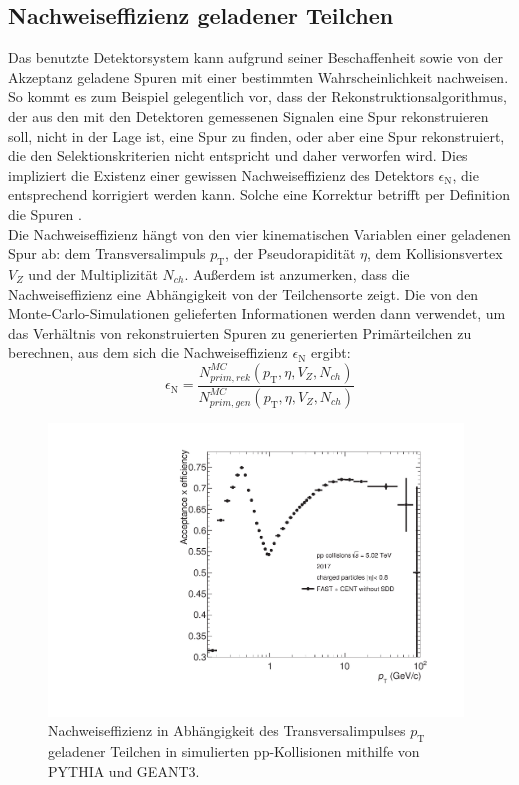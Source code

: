 \documentclass[12pt,a4paper]{report}
\begin{document}
\subsection{Nachweiseffizienz geladener Teilchen}
Das benutzte Detektorsystem kann aufgrund seiner Beschaffenheit sowie von der Akzeptanz geladene Spuren mit einer bestimmten Wahrscheinlichkeit nachweisen. So kommt es zum Beispiel gelegentlich vor, dass der Rekonstruktionsalgorithmus, der aus den mit den Detektoren gemessenen Signalen eine Spur rekonstruieren soll, nicht in der Lage ist, eine Spur zu finden, oder aber eine Spur rekonstruiert, die den Selektionskriterien nicht entspricht und daher verworfen wird. Dies impliziert die Existenz einer gewissen Nachweiseffizienz des Detektors $\epsilon_{\mathrm{N}}$, die entsprechend korrigiert werden kann. Solche eine Korrektur betrifft per Definition die Spuren \cite{Acharya:2018qsh}.\\
Die Nachweiseffizienz hängt von den vier kinematischen Variablen einer geladenen Spur ab: dem Transversalimpuls $p_{\mathrm{T}}$, der Pseudorapidität $\eta$, dem Kollisionsvertex $V_{Z}$ und der Multiplizität $N_{ch}$. Außerdem ist anzumerken, dass die Nachweiseffizienz eine Abhängigkeit von der Teilchensorte zeigt. Die von den Monte-Carlo-Simulationen gelieferten Informationen werden dann verwendet, um das Verhältnis von rekonstruierten Spuren zu generierten Primärteilchen zu berechnen, aus dem sich die Nachweiseffizienz $\epsilon_{\mathrm{N}}$ ergibt:
\begin{equation} \label{eq:TrackingEff}
  \epsilon_{\mathrm{N}}=\dfrac{N^{MC}_{prim,rek}(p_{\mathrm{T}}, \eta, V_{Z}, N_{ch})}{N^{MC}_{prim,gen}(p_{\mathrm{T}}, \eta, V_{Z}, N_{ch})}
\end{equation}
\begin{figure}[tb!]
\centering
\includegraphics[width=11cm]{Plots/trackingEfficiency.pdf}  
\caption{Nachweiseffizienz in Abhängigkeit des Transversalimpulses $p_{\mathrm{T}}$ geladener Teilchen in simulierten pp-Kollisionen mithilfe von PYTHIA und GEANT3.}
\label{TrackingEff}
\end{figure}
\end{document}
